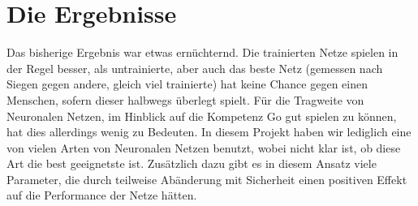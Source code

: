 \section{Die Ergebnisse}
Das bisherige Ergebnis war etwas ernüchternd. Die trainierten Netze spielen in
der Regel besser, als untrainierte, aber auch das beste Netz (gemessen nach
Siegen gegen andere, gleich viel trainierte) hat keine Chance gegen einen 
Menschen, sofern dieser halbwegs überlegt spielt.
Für die Tragweite von Neuronalen Netzen, im Hinblick auf die Kompetenz Go gut
spielen zu können, hat dies allerdings wenig zu Bedeuten. In diesem Projekt
haben wir lediglich eine von vielen Arten von Neuronalen Netzen benutzt, wobei
nicht klar ist, ob diese Art die best geeignetste ist. Zusätzlich dazu gibt es
in diesem Ansatz viele Parameter, die durch teilweise Abänderung mit Sicherheit 
einen positiven Effekt auf die Performance der Netze hätten. 